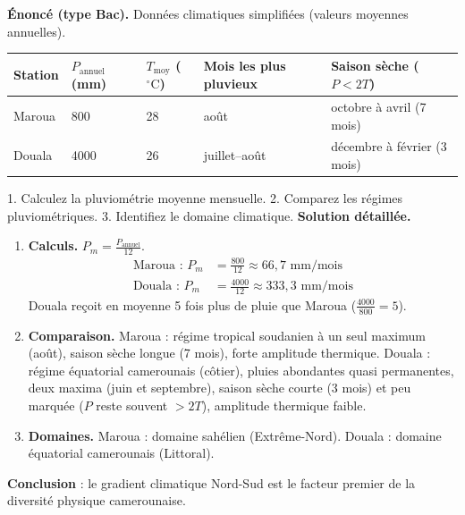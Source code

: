 \documentclass[11pt]{article}
\newcommand{\cle}[1]{{\popxbold\color{popdark}#1}}
\begin{document}
\begin{exoresolu}
\textbf{Énoncé (type Bac).} Données climatiques simplifiées (valeurs moyennes annuelles).

\begin{center}
\begin{tabularx}{\linewidth}{|l|X|X|X|X|}
\hline
\rowcolor{popblueL} Station & $P_{\text{annuel}}$ (mm) & $T_{\text{moy}}$ ($^{\circ}\mathrm{C}$) & Mois les plus pluvieux & Saison sèche ($P < 2T$) \\
\hline
Maroua & 800 & 28 & août & octobre à avril (7 mois) \\
\hline
Douala & \num{4000} & 26 & juillet--août & décembre à février (3 mois) \\
\hline
\end{tabularx}
\end{center}

1. Calculez la pluviométrie moyenne mensuelle. 2. Comparez les régimes pluviométriques. 3. Identifiez le domaine climatique.
\tcblower
\textbf{Solution détaillée.}
\begin{enumerate}
\item \textbf{Calculs.} $P_m = \frac{P_{\text{annuel}}}{12}$.
\begin{align*}
\text{Maroua : } P_m &= \frac{800}{12} \approx 66,7 \text{ mm/mois} \\
\text{Douala : } P_m &= \frac{4000}{12} \approx 333,3 \text{ mm/mois}
\end{align*}
Douala reçoit en moyenne 5 fois plus de pluie que Maroua ($\frac{4000}{800}=5$).
\item \textbf{Comparaison.} Maroua : régime \cle{tropical soudanien} à un seul maximum (août), saison sèche longue (7 mois), forte amplitude thermique. Douala : régime \cle{équatorial camerounais} (côtier), pluies abondantes quasi permanentes, deux maxima (juin et septembre), saison sèche courte (3 mois) et peu marquée ($P$ reste souvent $> 2T$), amplitude thermique faible.
\item \textbf{Domaines.} Maroua : domaine sahélien (Extrême-Nord). Douala : domaine équatorial camerounais (Littoral).
\end{enumerate}
\textbf{Conclusion} : le gradient climatique Nord-Sud est le facteur premier de la diversité physique camerounaise.
\end{exoresolu}
\end{document}
